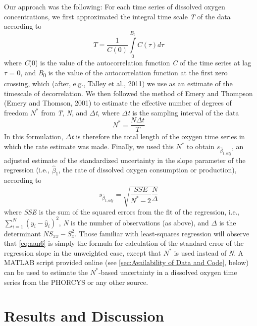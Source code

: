 Our approach was the following: For each time series of dissolved oxygen concentrations, we first approximated the integral time scale \emph{T} of the data according to
\begin{equation} \label{eq:aan4}
T = \frac{1}{{C(0)}}\int\limits_0^{{B_0}} {C(\tau )d\tau }
\end{equation}
where \emph{C}(0) is the value of the autocorrelation function \emph{C} of the time series at lag $\tau$ = 0, and \emph{B}\textsubscript{0} is the value of the autocorrelation function at the first zero crossing, which (after, e.g., Talley et al., 2011) we use as an estimate of the timescale of decorrelation. We then followed the method of Emery and Thompson (Emery and Thomson, 2001) to estimate the effective number of degrees of freedom $N^*$ from \emph{T}, \emph{N}, and $\Delta$\emph{t}, where $\Delta$\emph{t} is the sampling interval of the data
\begin{equation} \label{eq:aan5}
N^* = \frac{{N\Delta t}}{T}
\end{equation}
In this formulation, $\Delta$\emph{t} is therefore the total length of the oxygen time series in which the rate estimate was made. Finally, we used this $N^*$ to obtain ${s_{{{\hat \beta }_{1,adj}}}}$, an adjusted estimate of the standardized uncertainty in the slope parameter of the regression (i.e., ${\hat \beta _1}$, the rate of dissolved oxygen consumption or production), according to
\begin{equation} \label{eq:aan6}
{s_{{{\hat \beta }_{1,adj}}}} = \sqrt {\frac{{SSE}}{{N^* - 2}}\frac{N}{\Delta }}
\end{equation}
where \emph{SSE} is the sum of the squared errors from the fit of the regression, i.e., $\sum\limits_{i = 1}^N {{{({y_i} - {{\hat y}_i})}^2}}$, \emph{N} is the number of observations (as above), and $\Delta$ is the determinant $N{S_{xx}} - S_x^2$. Those familiar with least-squares regression will observe that \autoref{eq:aan6} is simply the formula for calculation of the standard error of the regression slope in the unweighted case, except that $N^*$ is used instead of \emph{N}. A MATLAB script provided online (see \autoref{sec:Availability of Data and Code}, below) can be used to estimate the $N^*$-based uncertainty in a dissolved oxygen time series from the PHORCYS or any other source.
\section{Results and Discussion}

